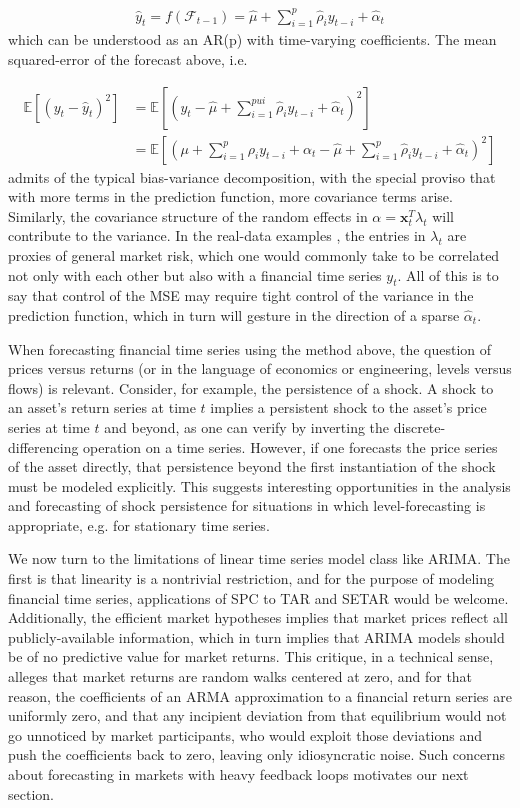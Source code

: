 \documentclass[11pt]{article}
\newcommand{\x}{\textbf{x}}
\def\E{\mathbb{E}} %
\theoremstyle{definition}
\begin{document}
\begin{align}
\hat{y}_{t} = f(\mathcal{F}_{t-1}) = \hat\mu + \sum^{p}_{i=1}\hat\rho_{i}y_{t-i} + \hat{\alpha}_{t}
\end{align}
which can be understood as an AR(p) with time-varying coefficients.  The mean squared-error of the forecast above, i.e.

\begin{align}
  \E[(y_{t}-\hat{y}_{t})^{2}] &= \E[(y_{t} - \hat\mu + \sum^{pui}_{i=1}\hat\rho_{i}y_{t-i} + \hat{\alpha}_{t})^{2}]\\
  &= \E[(\mu + \sum^{p}_{i=1}\rho_{i}y_{t-i} + \alpha_{t} - \hat\mu + \sum^{p}_{i=1}\hat\rho_{i}y_{t-i} + \hat{\alpha}_{t})^{2}] 
  \end{align}
admits of the typical bias-variance decomposition, with the special proviso that with more terms in the prediction function, more covariance terms arise.  Similarly, the covariance structure of the random effects in $\alpha = \x_{t}^{T}\lambda_{t}$ will contribute to the variance.  In the real-data examples \cite{lin2021minimizing}, the entries in $\lambda_{t}$ are proxies of general market risk, which one would commonly take to be correlated not only with each other but also with a financial time series $y_{t}$.  All of this is to say that control of the MSE may require tight control of the variance in the prediction function, which in turn will gesture in the direction of a sparse $\hat\alpha_{t}$.

When forecasting financial time series using the method above, the question of prices versus returns (or in the language of economics or engineering, levels versus flows) is relevant.  Consider, for example, the persistence of a shock.  A shock to an asset's return series at time $t$ implies a persistent shock to the asset's price series at time $t$ and beyond, as one can verify by inverting the discrete-differencing operation on a time series.  However, if one forecasts the price series of the asset directly, that persistence beyond the first instantiation of the shock must be modeled explicitly.  This suggests interesting opportunities in the analysis and forecasting of shock persistence for situations in which level-forecasting is appropriate, e.g. for stationary time series.

We now turn to the limitations of linear time series model class like ARIMA.  The first is that linearity is a nontrivial restriction, and for the purpose of modeling financial time series, applications of SPC to TAR and SETAR would be welcome.  Additionally, the efficient market hypotheses implies that market prices reflect all publicly-available information, which in turn implies that ARIMA models should be of no predictive value for market returns.  This critique, in a technical sense, alleges that market returns are random walks centered at zero, and for that reason, the coefficients of an ARMA approximation to a financial return series are uniformly zero, and that any incipient deviation from that equilibrium would not go unnoticed by market participants, who would exploit those deviations and push the coefficients back to zero, leaving only idiosyncratic noise.  Such concerns about forecasting in markets with heavy feedback loops motivates our next section.
\end{document}
